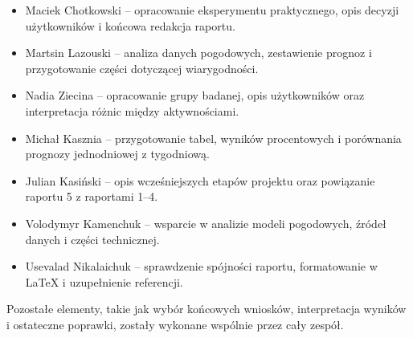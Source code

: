 \documentclass[a4paper,12pt]{article}
\begin{document}
\begin{itemize}
    \item Maciek Chotkowski -- opracowanie eksperymentu praktycznego, opis decyzji użytkowników i końcowa redakcja raportu.
    \item Martsin Lazouski -- analiza danych pogodowych, zestawienie prognoz i przygotowanie części dotyczącej wiarygodności.
    \item Nadia Ziecina -- opracowanie grupy badanej, opis użytkowników oraz interpretacja różnic między aktywnościami.
    \item Michał Kasznia -- przygotowanie tabel, wyników procentowych i porównania prognozy jednodniowej z tygodniową.
    \item Julian Kasiński -- opis wcześniejszych etapów projektu oraz powiązanie raportu 5 z raportami 1--4.
    \item Volodymyr Kamenchuk -- wsparcie w analizie modeli pogodowych, źródeł danych i części technicznej.
    \item Usevalad Nikalaichuk -- sprawdzenie spójności raportu, formatowanie w \LaTeX{} i uzupełnienie referencji.
\end{itemize}

\noindent
Pozostałe elementy, takie jak wybór końcowych wniosków, interpretacja wyników i
ostateczne poprawki, zostały wykonane wspólnie przez cały zespół.
\end{document}
